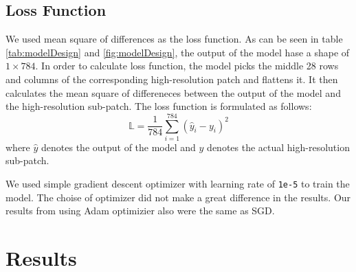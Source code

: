\documentclass{article}
\begin{document}
\subsection{Loss Function}
We used mean square of
differences as the loss function. As can be
seen in table \ref{tab:modelDesign} and 
\ref{fig:modelDesign}, the output of
the model hase a shape of $1 \times 784$.
In order to calculate loss function,
the model picks the middle 28 rows and columns of the
corresponding high-resolution patch and flattens
it. It then calculates the mean square of differeneces
between the output of the model and the high-resolution
sub-patch. The loss function is formulated as follows:
\begin{equation}
    \mathbb{L} = 
    \frac{1}{784}\sum_{i=1}^{784}({\hat{y}_i - y_i})^2
\end{equation}
where $\hat{y}$ denotes the output of the model and
$y$ denotes the actual high-resolution sub-patch.

We used simple gradient descent optimizer with learning
rate of \texttt{1e-5} to train the model. The choise of
optimizer did not make a great difference in the results.
Our results from using Adam optimizier also were the same
as SGD.

\section{Results}
\end{document}
